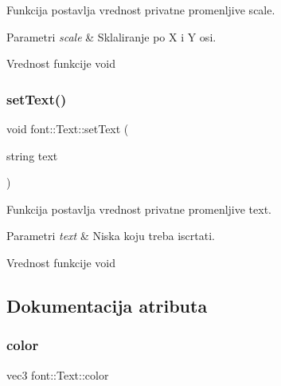 Funkcija postavlja vrednost privatne promenljive scale. 


\begin{DoxyParams}{Parametri}
{\em scale} & Sklaliranje po X i Y osi. \\
\hline
\end{DoxyParams}
\begin{DoxyReturn}{Vrednost funkcije}
void 
\end{DoxyReturn}
\mbox{\label{classfont_1_1Text_a3eae0fce16f5ea89ae3b0fae55cf3e93}} 
\subsubsection{\texorpdfstring{set\+Text()}{setText()}}
{\footnotesize\ttfamily void font\+::\+Text\+::set\+Text (\begin{DoxyParamCaption}\item[{string}]{text }\end{DoxyParamCaption})}



Funkcija postavlja vrednost privatne promenljive text. 


\begin{DoxyParams}{Parametri}
{\em text} & Niska koju treba iscrtati. \\
\hline
\end{DoxyParams}
\begin{DoxyReturn}{Vrednost funkcije}
void 
\end{DoxyReturn}


\subsection{Dokumentacija atributa}
\mbox{\label{classfont_1_1Text_a83c69eadc420a466aaade60393f35b24}} 
\subsubsection{\texorpdfstring{color}{color}}
{\footnotesize\ttfamily vec3 font\+::\+Text\+::color\hspace{0.3cm}{\ttfamily [private]}}



